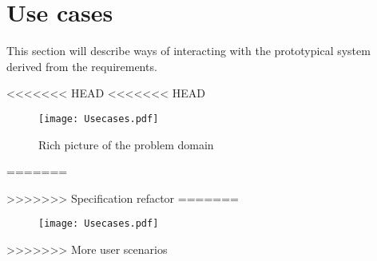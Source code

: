 \section{Use cases}\label{sec:usecases}

This section will describe ways of interacting with the prototypical system derived from the requirements.

<<<<<<< HEAD
<<<<<<< HEAD
\begin{figure}
 \centering 
 \texttt{[image: Usecases.pdf]}
 \caption{Rich picture of the problem domain}
\end{figure}
=======

>>>>>>> Specification refactor
=======
\begin{figure}
 \centering 
 \texttt{[image: Usecases.pdf]}
\end{figure}
>>>>>>> More user scenarios
